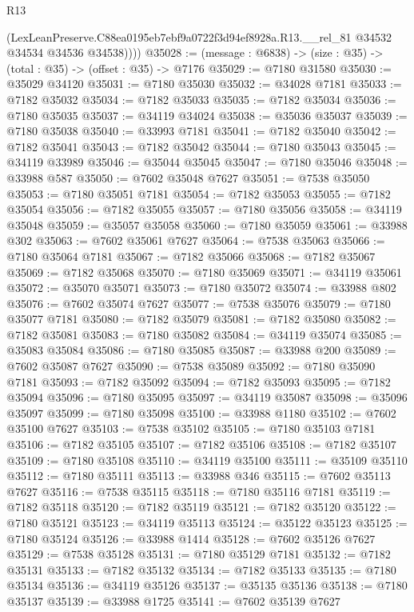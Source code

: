 \begin{lexlean}{R13}
\begin{coremodule}
          (LexLeanPreserve.C88ea0195eb7ebf9a0722f3d94ef8928a.R13.__rel_81
            @34532
            @34534
            @34536
            @34538))))
@35028 := (message : @6838) -> (size : @35) -> (total : @35) -> (offset : @35) -> @7176
@35029 := @7180 @31580
@35030 := @35029 @34120
@35031 := @7180 @35030
@35032 := @34028 @7181
@35033 := @7182 @35032
@35034 := @7182 @35033
@35035 := @7182 @35034
@35036 := @7180 @35035
@35037 := @34119 @34024
@35038 := @35036 @35037
@35039 := @7180 @35038
@35040 := @33993 @7181
@35041 := @7182 @35040
@35042 := @7182 @35041
@35043 := @7182 @35042
@35044 := @7180 @35043
@35045 := @34119 @33989
@35046 := @35044 @35045
@35047 := @7180 @35046
@35048 := @33988 @587
@35050 := @7602 @35048 @7627
@35051 := @7538 @35050
@35053 := @7180 @35051 @7181
@35054 := @7182 @35053
@35055 := @7182 @35054
@35056 := @7182 @35055
@35057 := @7180 @35056
@35058 := @34119 @35048
@35059 := @35057 @35058
@35060 := @7180 @35059
@35061 := @33988 @302
@35063 := @7602 @35061 @7627
@35064 := @7538 @35063
@35066 := @7180 @35064 @7181
@35067 := @7182 @35066
@35068 := @7182 @35067
@35069 := @7182 @35068
@35070 := @7180 @35069
@35071 := @34119 @35061
@35072 := @35070 @35071
@35073 := @7180 @35072
@35074 := @33988 @802
@35076 := @7602 @35074 @7627
@35077 := @7538 @35076
@35079 := @7180 @35077 @7181
@35080 := @7182 @35079
@35081 := @7182 @35080
@35082 := @7182 @35081
@35083 := @7180 @35082
@35084 := @34119 @35074
@35085 := @35083 @35084
@35086 := @7180 @35085
@35087 := @33988 @200
@35089 := @7602 @35087 @7627
@35090 := @7538 @35089
@35092 := @7180 @35090 @7181
@35093 := @7182 @35092
@35094 := @7182 @35093
@35095 := @7182 @35094
@35096 := @7180 @35095
@35097 := @34119 @35087
@35098 := @35096 @35097
@35099 := @7180 @35098
@35100 := @33988 @1180
@35102 := @7602 @35100 @7627
@35103 := @7538 @35102
@35105 := @7180 @35103 @7181
@35106 := @7182 @35105
@35107 := @7182 @35106
@35108 := @7182 @35107
@35109 := @7180 @35108
@35110 := @34119 @35100
@35111 := @35109 @35110
@35112 := @7180 @35111
@35113 := @33988 @346
@35115 := @7602 @35113 @7627
@35116 := @7538 @35115
@35118 := @7180 @35116 @7181
@35119 := @7182 @35118
@35120 := @7182 @35119
@35121 := @7182 @35120
@35122 := @7180 @35121
@35123 := @34119 @35113
@35124 := @35122 @35123
@35125 := @7180 @35124
@35126 := @33988 @1414
@35128 := @7602 @35126 @7627
@35129 := @7538 @35128
@35131 := @7180 @35129 @7181
@35132 := @7182 @35131
@35133 := @7182 @35132
@35134 := @7182 @35133
@35135 := @7180 @35134
@35136 := @34119 @35126
@35137 := @35135 @35136
@35138 := @7180 @35137
@35139 := @33988 @1725
@35141 := @7602 @35139 @7627

\end{coremodule}
\end{lexlean}
